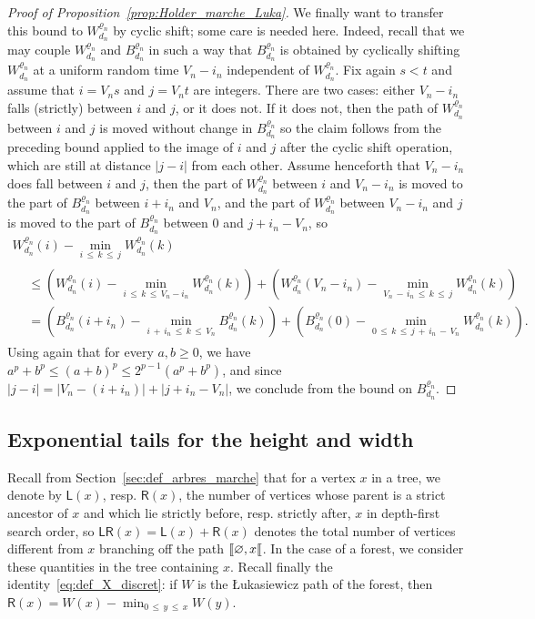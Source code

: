 \documentclass[10pt]{amsart}
\theoremstyle{definition}\newtheorem{defi}[theo]{Definition}\newtheorem{rema}[theo]{Remark}\newtheorem{exam}[theo]{Example}\newtheorem{exem}[theo]{Example}\newtheorem{nota}[theo]{Notation}
\newcommand{\llbracket}{\mathopen{[\mkern -2.7mu[}}
\newcommand{\1}{\ensembles{1}}
\renewcommand{\le}{\leqslant}
\renewcommand{\ge}{\geqslant}
\newcommand{\LL}{\mathsf{L}}
\newcommand{\RR}{\mathsf{R}}
\newcommand{\LR}{\mathsf{LR}}
\newcommand{\Wfn}{W_{d_n}^{\varrho_n}}
\newcommand{\Bfn}{B_{d_n}^{\varrho_n}}
\newcommand{\vertices}{V}
\providecommand{\?}{}
\begin{document}
\begin{proof}[Proof of Proposition~\ref{prop:Holder_marche_Luka}]
We finally want to transfer this bound to $\Wfn$ by cyclic shift; some care is needed here. Indeed, recall that we may couple $\Wfn$ and $\Bfn$ in such a way that $\Bfn$ is obtained by cyclically shifting $\Wfn$ at a uniform random time $\vertices_n - i_n$ independent of $\Wfn$. Fix again $s<t$ and assume that $i = \vertices_{n} s$ and $ j= \vertices_{n} t$ are integers. There are two cases: either $\vertices_n - i_n$ falls (strictly) between $i$ and $j$, or it does not. If it does not, then the path of $\Wfn$ between $i$ and $j$ is moved without change in $\Bfn$ so the claim follows from the preceding bound applied to the image of $i$ and $j$ after the cyclic shift operation, which are still at distance $|j-i|$ from each other. Assume henceforth that $\vertices_n - i_n$ does fall between $i$ and $j$, then the part of $\Wfn$ between $i$ and $\vertices_n - i_n$ is moved to the part of $\Bfn$ between $i + i_n$ and $\vertices_n$, and the part of $\Wfn$ between $\vertices_n - i_n$ and $j$ is moved to the part of $\Bfn$ between $0$ and $j + i_n - \vertices_n$, so
\begin{multline*}
\Wfn(i) - \min_{i\,\le\,k\,\le\,j} \Wfn(k)
\\
\begin{aligned}
&\le\left(\Wfn(i) - \min_{i\,\le\,k\,\le\,\vertices_n - i_n} \Wfn(k)\right) + \left(\Wfn\left(\vertices_n - i_n\right) - \min_{\vertices_n\,-\,i_n\,\le\,k\,\le\,j} \Wfn(k)\right)
\\
&= \left(\Bfn\left(i+i_{n}\right) - \min_{i\,+\,i_{n}\,\le\,k\,\le\,\vertices_n} \Bfn(k)\right) + \left(\Bfn(0) - \min_{0\,\le\,k\,\le\,j\,+\,i_{n}\,-\,\vertices_n} \Wfn(k)\right).
\end{aligned}
\end{multline*}
Using again that for every $a, b \ge 0$, we have $a^p + b^p \le (a+b)^p \le 2^{p-1} (a^p + b^p)$, and since $|j-i| = |\vertices_n - (i + i_n)| + |j + i_n - \vertices_n|$, we conclude from the bound on $\Bfn$.
\end{proof}


\subsection{Exponential tails for the height and width}\label{sec:queues_exp}

Recall from Section~\ref{sec:def_arbres_marche} that for a vertex $x$ in a tree, we denote by $\LL(x)$, resp. $\RR(x)$, the number of vertices whose parent is a strict ancestor of $x$ and which lie strictly before, resp. strictly after, $x$ in depth-first search order, so $\LR(x) = \LL(x) + \RR(x)$ denotes the total number of vertices different from $x$ branching off the path $\llbracket \varnothing, x\llbracket$. In the case of a forest, we consider these quantities in the tree containing $x$. Recall finally the identity~\eqref{eq:def_X_discret}: if $W$ is the {\L}ukasiewicz path of the forest, then $\RR(x) = W(x) - \min_{0\,\le\,y\,\le\,x} W(y)$.
\end{document}

